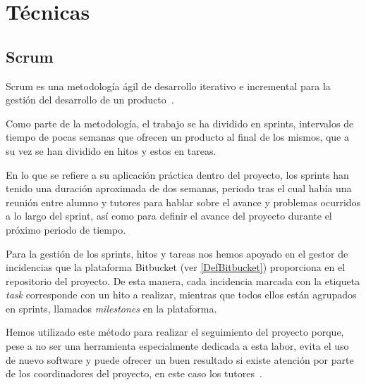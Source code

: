 

\section{Técnicas}
\subsection{Scrum}

Scrum es una metodología ágil de desarrollo iterativo e incremental para la gestión del desarrollo de un producto~\cite{wikiScrum}. 

Como parte de la metodología, el trabajo se ha dividido en sprints, intervalos de tiempo de pocas semanas que ofrecen un producto al final de los mismos, que a su vez se han dividido en hitos y estos en tareas.

En lo que se refiere a su aplicación práctica dentro del proyecto, los sprints han tenido una duración aproximada de dos semanas, periodo tras el cual había una reunión entre alumno y tutores para hablar sobre el avance y problemas ocurridos a lo largo del sprint, así como para definir el avance del proyecto durante el próximo periodo de tiempo.

Para la gestión de los sprints, hitos y tareas nos hemos apoyado en el gestor de incidencias que la plataforma Bitbucket (ver \ref{DefBitbucket}) proporciona en el repositorio del proyecto. De esta manera, cada incidencia marcada con la etiqueta \textit{task} corresponde con un hito a realizar, mientras que todos ellos están agrupados en sprints, llamados \textit{milestones} en la plataforma.

Hemos utilizado este método para realizar el seguimiento del proyecto porque, pese a no ser una herramienta especialmente dedicada a esta labor, evita el uso de nuevo software y puede ofrecer un buen resultado si existe atención por parte de los coordinadores del proyecto, en este caso los tutores~\cite{WhyIssues}.


